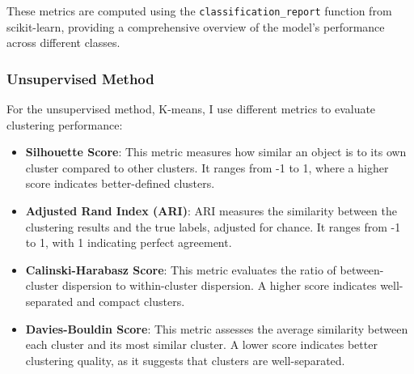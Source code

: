 \documentclass[12pt]{article}
\begin{document}
        These metrics are computed using the \texttt{classification\_report} function from scikit-learn, providing a comprehensive overview of the model’s performance across different classes.
        
    
        \subsubsection{Unsupervised Method}
        For the unsupervised method, K-means, I use different metrics to evaluate clustering performance:
        \begin{itemize}
            \item \textbf{Silhouette Score}: This metric measures how similar an object is to its own cluster compared to other clusters. It ranges from -1 to 1, where a higher score indicates better-defined clusters.
            \item \textbf{Adjusted Rand Index (ARI)}: ARI measures the similarity between the clustering results and the true labels, adjusted for chance. It ranges from -1 to 1, with 1 indicating perfect agreement.
            \item \textbf{Calinski-Harabasz Score}: This metric evaluates the ratio of between-cluster dispersion to within-cluster dispersion. A higher score indicates well-separated and compact clusters.
            \item \textbf{Davies-Bouldin Score}: This metric assesses the average similarity between each cluster and its most similar cluster. A lower score indicates better clustering quality, as it suggests that clusters are well-separated.
        \end{itemize}
    
\end{document}
